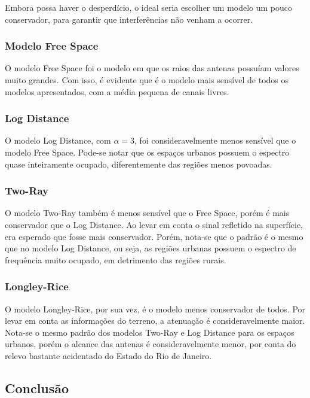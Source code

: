 Embora possa haver o desperdício, o ideal seria escolher um modelo um pouco conservador, para garantir que interferências não venham a ocorrer.

\subsubsection{Modelo Free Space}

O modelo Free Space foi o modelo em que os raios das antenas possuíam valores muito grandes. Com isso, é evidente que é o modelo mais sensível de todos os modelos apresentados, com a média pequena de canais livres.

\subsubsection{Log Distance}

O modelo Log Distance, com \begin{math}\alpha = 3 \end{math}, foi consideravelmente menos sensível que o modelo Free Space. Pode-se notar que os espaços urbanos possuem o espectro quase inteiramente ocupado, diferentemente das regiões menos povoadas.

\subsubsection{Two-Ray}

O modelo Two-Ray também é menos sensível que o Free Space, porém é mais conservador que o Log Distance. Ao levar em conta o sinal refletido na superfície, era esperado que fosse mais conservador. Porém, nota-se que o padrão é o mesmo que no modelo Log Distance, ou seja, as regiões urbanas possuem o espectro de frequência muito ocupado, em detrimento das regiões rurais.

\subsubsection{Longley-Rice}

O modelo Longley-Rice, por sua vez, é o modelo menos conservador de todos. Por levar em conta as informações do terreno, a atenuação é consideravelmente maior. Nota-se o mesmo padrão dos modelos Two-Ray e Log Distance para os espaços urbanos, porém o alcance das antenas é consideravelmente menor, por conta do relevo bastante acidentado do Estado do Rio de Janeiro.

\subsection{Conclusão}

